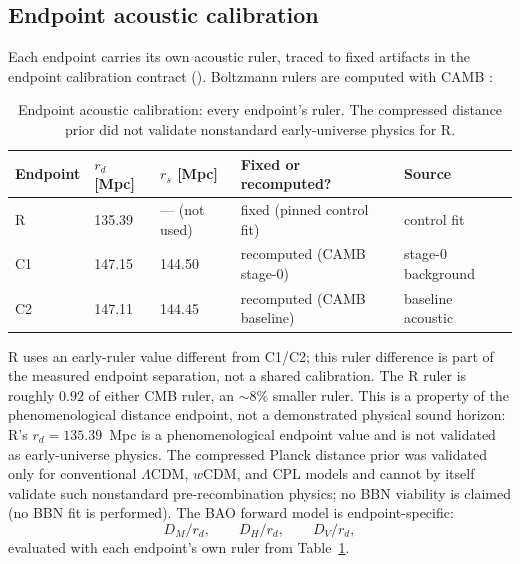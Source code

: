 \subsection{Endpoint acoustic calibration}
\label{sec:calibration}

Each endpoint carries its own acoustic ruler, traced to fixed
artifacts in the endpoint calibration contract
(). Boltzmann
rulers are computed with CAMB \citep{Lewis2000}:

\begin{table}[!htbp]
  \centering
  \caption{Endpoint acoustic calibration: every endpoint's ruler.
  The compressed distance prior \citep{Chen2019} did not validate
  nonstandard early-universe physics for R.}
  \label{tab:calibration}
  \begin{tabular}{lllll}
    \toprule
    Endpoint & $r_{d}$ [Mpc] & $r_{s}$ [Mpc] &
      Fixed or recomputed? & Source \\
    \midrule
    R & 135.39 & --- (not used) &
      fixed (pinned control fit) & control fit \\
    C1 & 147.15 & 144.50 &
      recomputed (CAMB stage-0) & stage-0 background \\
    C2 & 147.11 & 144.45 &
      recomputed (CAMB baseline) & baseline acoustic \\
    \bottomrule
  \end{tabular}
\end{table}

R uses an early-ruler value different from C1/C2; this ruler
difference is part of the measured endpoint separation, not a shared
calibration. The R ruler is roughly $0.92$ of either CMB ruler, an
$\sim8\%$ smaller ruler. This is a property of the phenomenological
distance endpoint, not a demonstrated physical sound horizon: R's
$r_{d}=135.39$~Mpc is a phenomenological endpoint value and is not
validated as early-universe physics. The compressed Planck distance
prior \citep{Chen2019} was validated only for conventional
$\Lambda$CDM, $w$CDM, and CPL models and cannot by itself validate
such nonstandard pre-recombination physics; no BBN viability is
claimed (no BBN fit is performed). The BAO forward model is endpoint-specific:
\begin{equation}
  D_{M}/r_{d},\qquad D_{H}/r_{d},\qquad D_{V}/r_{d},
  \label{eq:bao-forward}
\end{equation}
evaluated with each endpoint's own ruler from
Table~\ref{tab:calibration}.


